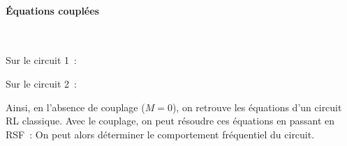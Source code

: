 \documentclass[../main/main.tex]{subfiles}
\begin{document}
\paragraph*{Équations couplées}~
\smallbreak
\noindent
\begin{minipage}[t]{.5\linewidth}
	\begin{center}
		Sur le circuit 1~:
	\end{center}
	\vspace*{-10pt}
\end{minipage}
\hfill
\begin{minipage}[t]{.5\linewidth}
	\begin{center}
		Sur le circuit 2~:
	\end{center}
	\vspace*{-10pt}
\end{minipage}
Ainsi, en l'absence de couplage ($M = 0$), on retrouve les équations d'un
circuit RL classique. Avec le couplage, on peut résoudre ces équations en
passant en RSF~:
On peut alors déterminer le comportement fréquentiel du circuit.
\end{document}
